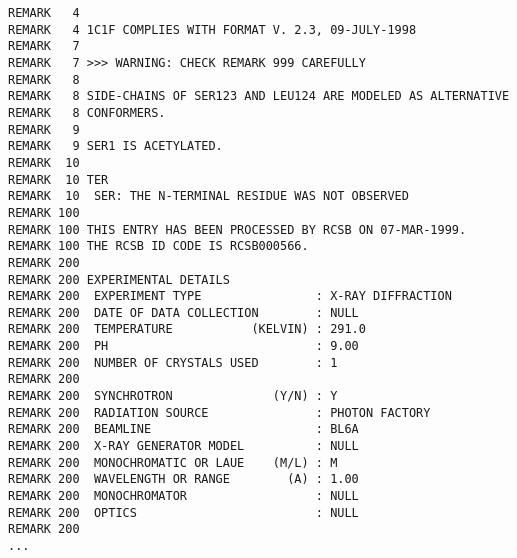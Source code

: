 \begin{lstlisting}
REMARK   4                                                                      
REMARK   4 1C1F COMPLIES WITH FORMAT V. 2.3, 09-JULY-1998                       
REMARK   7                                                                      
REMARK   7 >>> WARNING: CHECK REMARK 999 CAREFULLY                              
REMARK   8                                                                      
REMARK   8 SIDE-CHAINS OF SER123 AND LEU124 ARE MODELED AS ALTERNATIVE          
REMARK   8 CONFORMERS.                                                          
REMARK   9                                                                      
REMARK   9 SER1 IS ACETYLATED.                                                  
REMARK  10                                                                      
REMARK  10 TER                                                                  
REMARK  10  SER: THE N-TERMINAL RESIDUE WAS NOT OBSERVED                        
REMARK 100                                                                      
REMARK 100 THIS ENTRY HAS BEEN PROCESSED BY RCSB ON 07-MAR-1999.                
REMARK 100 THE RCSB ID CODE IS RCSB000566.                                      
REMARK 200                                                                      
REMARK 200 EXPERIMENTAL DETAILS                                                 
REMARK 200  EXPERIMENT TYPE                : X-RAY DIFFRACTION                  
REMARK 200  DATE OF DATA COLLECTION        : NULL                               
REMARK 200  TEMPERATURE           (KELVIN) : 291.0                              
REMARK 200  PH                             : 9.00                               
REMARK 200  NUMBER OF CRYSTALS USED        : 1                                  
REMARK 200                                                                      
REMARK 200  SYNCHROTRON              (Y/N) : Y                                  
REMARK 200  RADIATION SOURCE               : PHOTON FACTORY                     
REMARK 200  BEAMLINE                       : BL6A                               
REMARK 200  X-RAY GENERATOR MODEL          : NULL                               
REMARK 200  MONOCHROMATIC OR LAUE    (M/L) : M                                  
REMARK 200  WAVELENGTH OR RANGE        (A) : 1.00                               
REMARK 200  MONOCHROMATOR                  : NULL                               
REMARK 200  OPTICS                         : NULL                               
REMARK 200                                                                      
... 


\end{lstlisting}

